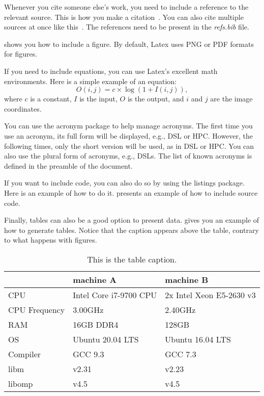 \documentclass[sigconf,balance,nonacm,authordraft]{acmart}
\begin{document}
Whenever you cite someone else's work, you need to include a reference to the relevant source. This is how you make a citation~\cite{Michie1968}. You can also cite multiple sources at once like this~\cite{Strachey2000,Connors2000}. The references need to be present in the \textit{refs.bib} file.



 shows you how to include a figure. By default, Latex uses PNG or PDF formats for figures.

If you need to include equations, you can use Latex's excellent math environments. Here is a simple example of an equation:
\begin{equation}\label{eq:log}
    O(i, j) = c \times \log{(1+I(i, j))},
\end{equation}
where $c$ is a constant, $I$ is the input, $O$ is the output, and $i$ and $j$ are the image coordinates.

You can use the acronym package to help manage acronyms. The first time you use an acronym, its full form will be displayed, e.g., \ac{DSL} or \ac{HPC}. However, the following times, only the short version will be used, as in \ac{DSL} or \ac{HPC}. You can also use the plural form of acronyms, e.g., \acp{DSL}. The list of known acronyms is defined in the preamble of the document.



If you want to include code, you can also do so by using the listings package. Here is an example of how to do it.  presents an example of how to include source code.

Finally, tables can also be a good option to present data.  gives you an example of how to generate tables. Notice that the caption appears above the table, contrary to what happens with figures.

\begin{table}[b]
\caption{This is the table caption.}
\label{tab:table1}
\footnotesize
\begin{tabular}{lll}
\toprule
         & machine A                   & machine B                           \\
\midrule
CPU      & Intel Core i7-9700 CPU      & 2x Intel Xeon E5-2630 v3            \\
CPU Frequency& 3.00GHz                     & 2.40GHz                             \\
RAM      & 16GB DDR4                   & 128GB                               \\
OS       & Ubuntu 20.04 LTS            & Ubuntu 16.04 LTS                    \\
Compiler & GCC 9.3                     & GCC 7.3                             \\
libm     & v2.31                       & v2.23                               \\
libomp   & v4.5                        & v4.5                                \\
\bottomrule
\end{tabular}
\end{table}
\end{document}
